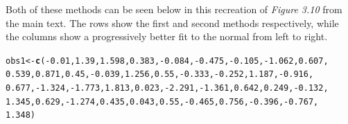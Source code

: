\documentclass{report}\usepackage[]{graphicx}\usepackage[]{color}
\makeatletter
\newcommand{\hlnum}[1]{\textcolor[rgb]{0.686,0.059,0.569}{#1}}%
\newcommand{\hlopt}[1]{\textcolor[rgb]{0,0,0}{#1}}%
\newcommand{\hlstd}[1]{\textcolor[rgb]{0.345,0.345,0.345}{#1}}%
\newcommand{\hlkwb}[1]{\textcolor[rgb]{0.69,0.353,0.396}{#1}}%
\newcommand{\hlkwd}[1]{\textcolor[rgb]{0.737,0.353,0.396}{\textbf{#1}}}%
\newenvironment{kframe}{%
 \def\at@end@of@kframe{}%
 \ifinner\ifhmode%
  \def\at@end@of@kframe{\end{minipage}}%
  \begin{minipage}{\columnwidth}%
 \fi\fi%
 \def\FrameCommand##1{\hskip\@totalleftmargin \hskip-\fboxsep
 \colorbox{shadecolor}{##1}\hskip-\fboxsep
     \hskip-\linewidth \hskip-\@totalleftmargin \hskip\columnwidth}%
 \MakeFramed {\advance\hsize-\width
   \@totalleftmargin\z@ \linewidth\hsize
   \@setminipage}}%
 {\par\unskip\endMakeFramed%
 \at@end@of@kframe}
\newenvironment{knitrout}{}{} %
\makeatother
\begin{document}
Both of these methods can be seen below in this recreation of \textit{Figure 3.10} from the main text.  The rows show the first and second methods respectively, while the columns show a progressively better fit to the normal from left to right.  
\begin{knitrout}
\color{fgcolor}\begin{kframe}
\begin{alltt}
\hlstd{obs1} \hlkwb{<-} \hlkwd{c}\hlstd{(}\hlopt{-}\hlnum{0.01}\hlstd{,} \hlnum{1.39}\hlstd{,} \hlnum{1.598}\hlstd{,} \hlnum{0.383}\hlstd{,} \hlopt{-}\hlnum{0.084}\hlstd{,} \hlopt{-}\hlnum{0.475}\hlstd{,} \hlopt{-}\hlnum{0.105}\hlstd{,} \hlopt{-}\hlnum{1.062}\hlstd{,} \hlnum{0.607}\hlstd{,}
    \hlnum{0.539}\hlstd{,} \hlnum{0.871}\hlstd{,} \hlnum{0.45}\hlstd{,} \hlopt{-}\hlnum{0.039}\hlstd{,} \hlnum{1.256}\hlstd{,} \hlnum{0.55}\hlstd{,} \hlopt{-}\hlnum{0.333}\hlstd{,} \hlopt{-}\hlnum{0.252}\hlstd{,} \hlnum{1.187}\hlstd{,} \hlopt{-}\hlnum{0.916}\hlstd{,}
    \hlnum{0.677}\hlstd{,} \hlopt{-}\hlnum{1.324}\hlstd{,} \hlopt{-}\hlnum{1.773}\hlstd{,} \hlnum{1.813}\hlstd{,} \hlnum{0.023}\hlstd{,} \hlopt{-}\hlnum{2.291}\hlstd{,} \hlopt{-}\hlnum{1.361}\hlstd{,} \hlnum{0.642}\hlstd{,} \hlnum{0.249}\hlstd{,} \hlopt{-}\hlnum{0.132}\hlstd{,}
    \hlnum{1.345}\hlstd{,} \hlnum{0.629}\hlstd{,} \hlopt{-}\hlnum{1.274}\hlstd{,} \hlnum{0.435}\hlstd{,} \hlnum{0.043}\hlstd{,} \hlnum{0.55}\hlstd{,} \hlopt{-}\hlnum{0.465}\hlstd{,} \hlnum{0.756}\hlstd{,} \hlopt{-}\hlnum{0.396}\hlstd{,} \hlopt{-}\hlnum{0.767}\hlstd{,}
    \hlnum{1.348}\hlstd{)}


\end{alltt}
\end{kframe}
\end{knitrout}
\end{document}

